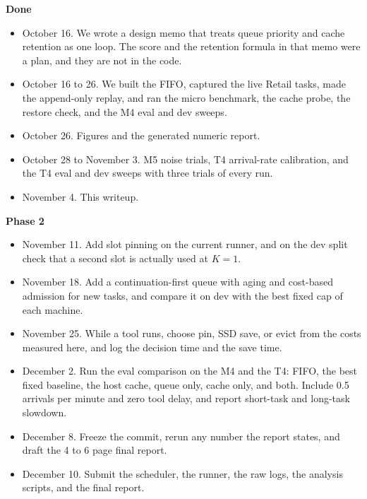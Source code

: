\documentclass[9pt,twocolumn]{extarticle}
\begin{document}
\textbf{Done}
\begin{itemize}
\item October 16. We wrote a design memo that treats queue priority and cache retention as one loop. The score and the retention formula in that memo were a plan, and they are not in the code.
\item October 16 to 26. We built the FIFO, captured the live Retail tasks, made the append-only replay, and ran the micro benchmark, the cache probe, the restore check, and the M4 eval and dev sweeps.
\item October 26. Figures and the generated numeric report.
\item October 28 to November 3. M5 noise trials, T4 arrival-rate calibration, and the T4 eval and dev sweeps with three trials of every run.
\item November 4. This writeup.
\end{itemize}

\textbf{Phase 2}
\begin{itemize}
\item November 11. Add slot pinning on the current runner, and on the dev split check that a second slot is actually used at $K = 1$.
\item November 18. Add a continuation-first queue with aging and cost-based admission for new tasks, and compare it on dev with the best fixed cap of each machine.
\item November 25. While a tool runs, choose pin, SSD save, or evict from the costs measured here, and log the decision time and the save time.
\item December 2. Run the eval comparison on the M4 and the T4: FIFO, the best fixed baseline, the host cache, queue only, cache only, and both. Include 0.5 arrivals per minute and zero tool delay, and report short-task and long-task slowdown.
\item December 8. Freeze the commit, rerun any number the report states, and draft the 4 to 6 page final report.
\item December 10. Submit the scheduler, the runner, the raw logs, the analysis scripts, and the final report.
\end{itemize}
\end{document}
